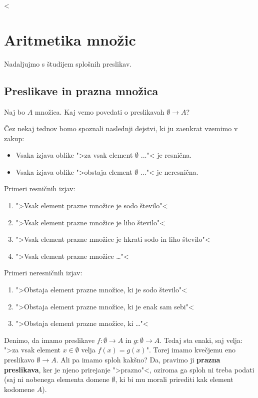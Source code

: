 <\chapter{Aritmetika množic}

Nadaljujmo s študijem splošnih preslikav.

\section{Preslikave in prazna množica}

Naj bo $A$ množica. Kaj vemo povedati o preslikavah $\emptyset \to A$?

Čez nekaj tednov bomo spoznali naslednji dejstvi, ki ju zaenkrat vzemimo v zakup:

\begin{itemize}
\item Vsaka izjava oblike ">za vsak element $\emptyset$ ..."< je resnična.
\item Vsaka izjava oblike ">obstaja element $\emptyset$ ..."< je neresnična.
\end{itemize}

Primeri resničnih izjav:
%
\begin{enumerate}
\item ">Vsak element prazne množice je sodo število"<
\item ">Vsak element prazne množice je liho število"<
\item ">Vsak element prazne množice je hkrati sodo in liho število"<
\item ">Vsak element prazne množice \dots"<
\end{enumerate}

Primeri neresničnih izjav:
%
\begin{enumerate}
\item ">Obstaja element prazne množice, ki je sodo število"<
\item ">Obstaja element prazne množice, ki je enak sam sebi"<
\item ">Obstaja element prazne množice, ki \dots"<
\end{enumerate}
%
Denimo, da imamo preslikave $f :\emptyset \to A$ in $g : \emptyset \to A$. Tedaj sta enaki, saj velja: ">za vsak element $x \in \emptyset$ velja $f(x) = g(x)$".
Torej imamo kvečjemu eno preslikavo $\emptyset \to A$. Ali pa imamo sploh kakšno? Da, pravimo ji \textbf{prazna preslikava}, ker je njeno prirejanje ">prazno"<, oziroma ga sploh ni treba podati (saj ni nobenega elementa domene $\emptyset$, ki bi mu morali prirediti kak element kodomene $A$).

